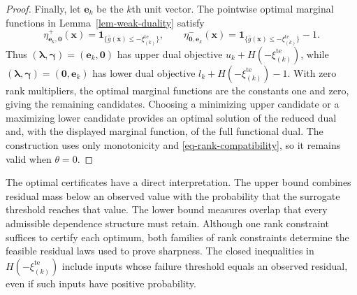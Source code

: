 \begin{proof}
  Finally, let $\bm e_k$ be the $k$th unit vector. The pointwise optimal marginal functions in Lemma~\ref{lem-weak-duality} satisfy
  \begin{equation}
    \eta^+_{\bm e_k,\bm0}(\bm x)
    =\mathbf1_{\{\hat g(\bm x)\le-\xi_{(k)}^{\mathrm{te}}\}},
    \qquad
    \eta^-_{\bm0,\bm e_k}(\bm x)
    =\mathbf1_{\{\hat g(\bm x)\le-\xi_{(k)}^{\mathrm{te}}\}}-1.
    \label{eq-optimal-threshold-functions}
  \end{equation}
  Thus $(\bm\lambda,\bm\gamma)=(\bm e_k,\bm0)$ has upper dual objective $u_k+H\left(-\xi_{(k)}^{\mathrm{te}}\right)$, while $(\bm\lambda,\bm\gamma)=(\bm0,\bm e_k)$ has lower dual objective $l_k+H\left(-\xi_{(k)}^{\mathrm{te}}\right)-1$. With zero rank multipliers, the optimal marginal functions are the constants one and zero, giving the remaining candidates. Choosing a minimizing upper candidate or a maximizing lower candidate provides an optimal solution of the reduced dual and, with the displayed marginal function, of the full functional dual. The construction uses only monotonicity and \eqref{eq-rank-compatibility}, so it remains valid when $\theta=0$.
\end{proof}

The optimal certificates have a direct interpretation. The upper bound combines residual mass below an observed value with the probability that the surrogate threshold reaches that value. The lower bound measures overlap that every admissible dependence structure must retain. Although one rank constraint suffices to certify each optimum, both families of rank constraints determine the feasible residual laws used to prove sharpness. The closed inequalities in $H\left(-\xi_{(k)}^{\mathrm{te}}\right)$ include inputs whose failure threshold equals an observed residual, even if such inputs have positive probability.

